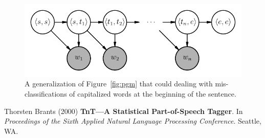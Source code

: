 \documentclass[11pt]{article}
\newcommand{\fig}[1]{Figure~\ref{fig:#1}}
\newcommand{\figlabel}[1]{\label{fig:#1}}
\begin{document}
\begin{figure}[htbp]
\begin{center}
    \includegraphics{pgm2.pdf}
\end{center}
\caption{%
A generalization of \fig{pgm} that could dealing with mis-classifications of
capitalized words at the beginning of the sentence.
\figlabel{pgm2}}
\end{figure}

\begin{thebibliography}{}\raggedright

 Thorsten Brants (2000)
\textbf{TnT---A Statistical Part-of-Speech Tagger}.
In \emph{Proceedings of the Sixth Applied Natural Language Processing
Conference}. Seattle, WA.

\end{thebibliography}
\end{document}
